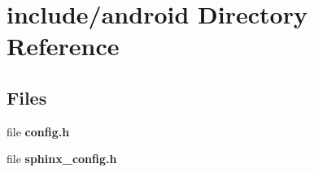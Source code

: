 \section{include/android Directory Reference}
\label{dir_035c76f7235f5f563d38e3ab90cb9716}
\subsection*{Files}
\begin{DoxyCompactItemize}
\item 
file {\bfseries config.\-h}
\item 
file {\bfseries sphinx\-\_\-config.\-h}
\end{DoxyCompactItemize}
